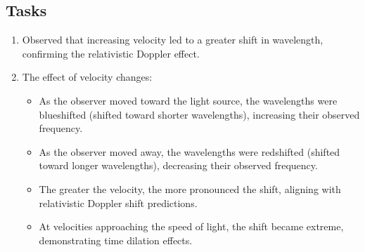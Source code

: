 \documentclass {article}
\begin{document}
\subsection{Tasks}
\begin{enumerate}

    \item Observed that increasing velocity led to a greater shift in wavelength, confirming the relativistic Doppler effect.
    \item The effect of velocity changes:
    \begin{itemize}
        \item As the observer moved toward the light source, the wavelengths were blueshifted (shifted toward shorter wavelengths), increasing their observed frequency.
        \item As the observer moved away, the wavelengths were redshifted (shifted toward longer wavelengths), decreasing their observed frequency.
        \item The greater the velocity, the more pronounced the shift, aligning with relativistic Doppler shift predictions.
        \item At velocities approaching the speed of light, the shift became extreme, demonstrating time dilation effects.
    \end{itemize}
\end{enumerate}
  
\end{document}
